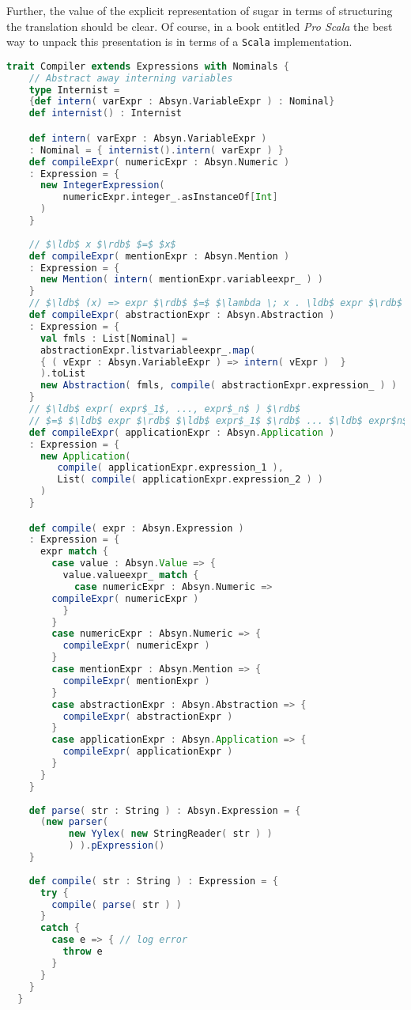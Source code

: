 Further, the value of the explicit representation of sugar in terms of
structuring the translation should be clear. Of course, in a book
entitled \emph{Pro Scala} the best way to unpack this presentation
is in terms of a \texttt{Scala} implementation.

\begin{lstlisting}[language=Scala,mathescape=true]
  trait Compiler extends Expressions with Nominals {
    // Abstract away interning variables
    type Internist =
    {def intern( varExpr : Absyn.VariableExpr ) : Nominal}
    def internist() : Internist

    def intern( varExpr : Absyn.VariableExpr )
    : Nominal = { internist().intern( varExpr ) }
    def compileExpr( numericExpr : Absyn.Numeric )
    : Expression = {
      new IntegerExpression(
          numericExpr.integer_.asInstanceOf[Int]
      )
    }
    
    // $\ldb$ x $\rdb$ $=$ $x$
    def compileExpr( mentionExpr : Absyn.Mention )
    : Expression = {
      new Mention( intern( mentionExpr.variableexpr_ ) )
    }
    // $\ldb$ (x) => expr $\rdb$ $=$ $\lambda \; x . \ldb$ expr $\rdb$ 
    def compileExpr( abstractionExpr : Absyn.Abstraction )
    : Expression = {
      val fmls : List[Nominal] =
      abstractionExpr.listvariableexpr_.map(
      { ( vExpr : Absyn.VariableExpr ) => intern( vExpr )  }
      ).toList
      new Abstraction( fmls, compile( abstractionExpr.expression_ ) )	    
    }
    // $\ldb$ expr( expr$_1$, ..., expr$_n$ ) $\rdb$
    // $=$ $\ldb$ expr $\rdb$ $\ldb$ expr$_1$ $\rdb$ ... $\ldb$ expr$n$ $\rdb$
    def compileExpr( applicationExpr : Absyn.Application )
    : Expression = {
      new Application(
         compile( applicationExpr.expression_1 ),
         List( compile( applicationExpr.expression_2 ) )
      )
    }

    def compile( expr : Absyn.Expression )
    : Expression = {
      expr match {
        case value : Absyn.Value => {
          value.valueexpr_ match {
            case numericExpr : Absyn.Numeric =>
	    compileExpr( numericExpr )
          }
        }
        case numericExpr : Absyn.Numeric => {
          compileExpr( numericExpr )
        }
        case mentionExpr : Absyn.Mention => {
          compileExpr( mentionExpr )
        }
        case abstractionExpr : Absyn.Abstraction => {
          compileExpr( abstractionExpr )	    
        }
        case applicationExpr : Absyn.Application => {
          compileExpr( applicationExpr )
        }
      }
    }
    
    def parse( str : String ) : Absyn.Expression = {
      (new parser(
           new Yylex( new StringReader( str ) )
           ) ).pExpression()
    }
    
    def compile( str : String ) : Expression = {
      try {
        compile( parse( str ) )
      }
      catch {
        case e => { // log error 
          throw e
        }
      }
    }
  }
\end{lstlisting}

